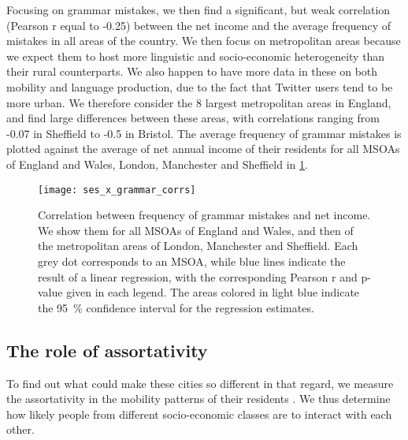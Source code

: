 \documentclass[../thesis.tex]{subfiles}
\begin{document}
Focusing on grammar mistakes, we then find a significant, but weak correlation (Pearson
r equal to -0.25) between the net income and the average frequency of mistakes in all
areas of the country. We then focus on metropolitan areas because we expect them to host
more linguistic and socio-economic heterogeneity than their rural counterparts. We also
happen to have more data in these on both mobility and language production, due to the
fact that Twitter users tend to be more urban. We therefore consider the 8 largest
metropolitan areas in England, and find large differences between these areas, with
correlations ranging from -0.07 in Sheffield to -0.5 in Bristol. The average frequency
of grammar mistakes is plotted against the average of net annual income of their
residents for all \acp{MSOA} of England and Wales, London, Manchester and Sheffield in
\cref{fig:ses_x_grammar_corrs}.
\begin{figure}
\centering
  \texttt{[image: ses\_x\_grammar\_corrs]}
  \caption{ Correlation between frequency of grammar mistakes and net income. We show
  them for all \acp{MSOA} of England and Wales, and then of the metropolitan areas of
  London, Manchester and Sheffield. Each grey dot corresponds to an \ac{MSOA}, while
  blue lines indicate the result of a linear regression, with the corresponding Pearson
  r and p-value given in each legend. The areas colored in light blue indicate the
  \SI{95}{\percent} confidence interval for the regression estimates.}
  \label{fig:ses_x_grammar_corrs}
\end{figure}


\subsection{The role of assortativity}

To find out what could make these cities so different in that regard, we measure the
assortativity in the mobility patterns of their residents
\cite{HilmanSocioeconomicBiases2022}. We thus determine how likely people from different
socio-economic classes are to interact with each other.
\end{document}
